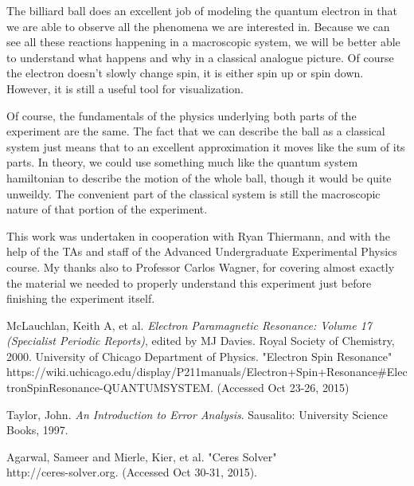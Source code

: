 \documentclass{article}
\begin{document}
	\vspace{.25cm}

	The billiard ball does an excellent job of modeling the quantum electron in that we are able to observe all the phenomena we are interested in.  Because we can see all these reactions happening in a macroscopic system, we will be better able to understand what happens and why in a classical analogue picture.  Of course the electron doesn't slowly change spin, it is either spin up or spin down.  However, it is still a useful tool for visualization.

	\vspace{.25cm}

	Of course, the fundamentals of the physics underlying both parts of the experiment are the same.  The fact that we can describe the ball as a classical system just means that to an excellent approximation it moves like the sum of its parts.  In theory, we could use something much like the quantum system hamiltonian to describe the motion of the whole ball, though it would be quite unweildy.  The convenient part of the classical system is still the macroscopic nature of that portion of the experiment.

	\vspace{.25cm}

	This work was undertaken in cooperation with Ryan Thiermann, and with the help of the TAs and staff of the Advanced Undergraduate Experimental Physics course.  My thanks also to Professor Carlos Wagner, for covering almost exactly the material we needed to properly understand this experiment just before finishing the experiment itself.

\begin{thebibliography}{10}
		McLauchlan, Keith A, et al. \emph{Electron Paramagnetic Resonance: Volume 17 (Specialist Periodic Reports)}, edited by MJ Davies. Royal Society of Chemistry, 2000.
		University of Chicago Department of Physics. "Electron Spin Resonance"\\
		https://wiki.uchicago.edu/display/P211manuals/Electron+Spin+Resonance\#ElectronSpinResonance-QUANTUMSYSTEM. (Accessed Oct 23-26, 2015)

		Taylor, John. \emph{An Introduction to Error Analysis}. Sausalito: University Science Books, 1997.

		Agarwal, Sameer and Mierle, Kier, et al. "Ceres Solver"\\
		http://ceres-solver.org. (Accessed Oct 30-31, 2015).
		
\end{thebibliography}
\end{document}
